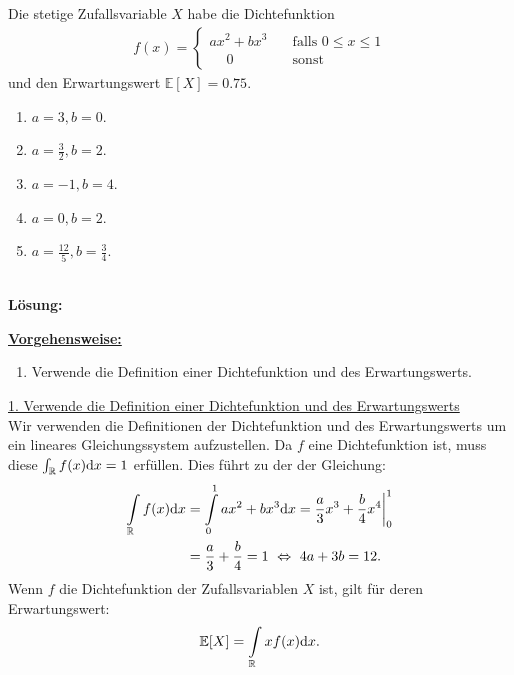 \newpage
\subsection*{}
Die stetige Zufallsvariable $ X $ habe die Dichtefunktion
\begin{align*}
	f(x) =
	\begin{cases}
		ax^2 + bx^3 \quad &\textrm{falls } 0 \leq x \leq 1\\
		\quad  \  0 \ \ &\textrm{sonst}
	\end{cases}
\end{align*}
und den Erwartungswert $ \mathbb{E}[X] = 0.75 $.
\renewcommand{\labelenumi}{(\alph{enumi})}
\begin{enumerate}
	\item 
	$a= 3,b=0$.
	\item
	$a= \frac{3}{2},b=2$.
	\item
	$a= -1,b=4$.
	\item
	$a= 0,b=2$.
	\item
	$a= \frac{12}{5},b=\frac{3}{4}$.	
\end{enumerate}
\ \\
\textbf{Lösung:}
\begin{mdframed}
\underline{\textbf{Vorgehensweise:}}
\renewcommand{\labelenumi}{\theenumi.}
\begin{enumerate}
\item Verwende die Definition einer Dichtefunktion und des Erwartungswerts.
\end{enumerate}
\end{mdframed}
\underline{1. Verwende die Definition einer Dichtefunktion und des Erwartungswerts}\\
Wir verwenden die Definitionen der Dichtefunktion und des Erwartungswerts um ein lineares Gleichungssystem aufzustellen.
Da $ f $ eine Dichtefunktion ist, muss diese $ \int_\mathbb{R} f(x) \text{\rmfamily d} x = 1 $ erfüllen.
Dies führt zu der der Gleichung:
\begin{align*}
	\int \limits_{\mathbb{R}} f(x) \text{\rmfamily d} x
	&=
	\int \limits_0^1 a x^2 + bx^3 \text{\rmfamily d} x
	=
	\frac{a}{3}x^3 + \frac{b}{4} x^4 \bigg|_{0}^1\\
	&=
	\frac{a}{3} + \frac{b}{4} = 1
	\ \Leftrightarrow \
	4 a + 3 b = 12. 
\end{align*}
Wenn $ f $ die Dichtefunktion der Zufallsvariablen $ X $ ist, gilt für deren Erwartungswert:
\begin{align*}
	\mathbb{E}[X]
	= 
	\int \limits_{\mathbb{R}} x f(x) \text{\rmfamily d} x.
\end{align*}
